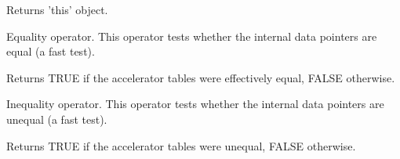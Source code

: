


Returns 'this' object.



Equality operator. This operator tests whether the internal data pointers are
equal (a fast test).




Returns TRUE if the accelerator tables were effectively equal, FALSE otherwise.



Inequality operator. This operator tests whether the internal data pointers are
unequal (a fast test).




Returns TRUE if the accelerator tables were unequal, FALSE otherwise.


